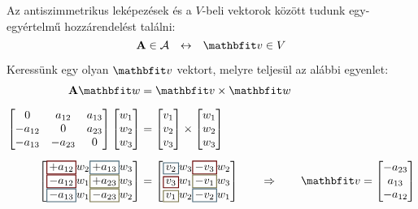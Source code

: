 \begin{note}
  Az antiszimmetrikus leképezések és a
  $V$-beli vektorok között tudunk egy-egyértelmű
  hozzárendelést találni:
  \begin{equation*}
    \rmat A \in \mathcal A
    \hspace{2.5mm} \leftrightarrow \hspace{2.5mm}
    \rvec v \in V
  \end{equation*}

  Keressünk egy olyan $\rvec v$ vektort,
  melyre teljesül az alábbi egyenlet:
  \begin{align*}
    \rmat A\rvec w
     & = \rvec v \times \rvec w
    \\[
    2mm
    ]
    \begin{bmatrix}
      0       & a_{12}  & a_{13} \\
      -a_{12} & 0       & a_{23} \\
      -a_{13} & -a_{23} & 0
    \end{bmatrix}
    \begin{bmatrix}
      w_1 \\
      w_2 \\
      w_3
    \end{bmatrix}
     & =
    \begin{bmatrix}
      v_1 \\
      v_2 \\
      v_3
    \end{bmatrix}
    \times
    \begin{bmatrix}
      w_1 \\
      w_2 \\
      w_3
    \end{bmatrix}
    \\[2mm]
    \begin{bmatrix}
      \rected{$+a_{12}$}{primaryColor}   w_2 \rected{$+a_{13}$}{secondaryColor} w_3 \\
      \rected{$-a_{12}$}{primaryColor}   w_1 \rected{$+a_{23}$}{ternaryColor}   w_3 \\
      \rected{$-a_{13}$}{secondaryColor} w_1 \rected{$-a_{23}$}{ternaryColor}   w_2
    \end{bmatrix}
     & =
    \begin{bmatrix}
      \rected{$v_2$}{secondaryColor} w_3 \rected{$-v_3$}{primaryColor}    w_2 \\
      \rected{$v_3$}{primaryColor}   w_1 \rected{$-v_1$}{ternaryColor}    w_3 \\
      \rected{$v_1$}{ternaryColor}   w_2 \rected{$-v_2$}{secondaryColor}  w_1
    \end{bmatrix}
    \qquad\Rightarrow\qquad
    \rvec v
    =
    \begin{bmatrix}
      -a_{23} \\
      a_{13}  \\
      -a_{12} \\
    \end{bmatrix}
  \end{align*}
\end{note}

